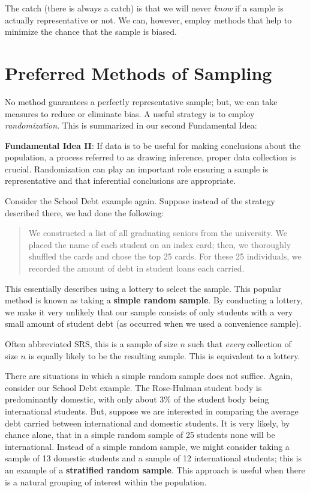 \documentclass[]{book}
\theoremstyle{plain}
\theoremstyle{mydefn}
\theoremstyle{myexmpl}
\theoremstyle{remark}
\let\BeginKnitrBlock\begin \let\EndKnitrBlock\end
\let\BeginKnitrBlock\begin \let\EndKnitrBlock\end
\begin{document}
The catch (there is always a catch) is that we will never \emph{know} if
a sample is actually representative or not. We can, however, employ
methods that help to minimize the chance that the sample is biased.

\section{Preferred Methods of
Sampling}\label{preferred-methods-of-sampling}

No method guarantees a perfectly representative sample; but, we can take
measures to reduce or eliminate bias. A useful strategy is to employ
\emph{randomization}. This is summarized in our second Fundamental Idea:

\BeginKnitrBlock{rmdfivefund}
\textbf{Fundamental Idea II}: If data is to be useful for making
conclusions about the population, a process referred to as drawing
inference, proper data collection is crucial. Randomization can play an
important role ensuring a sample is representative and that inferential
conclusions are appropriate.
\EndKnitrBlock{rmdfivefund}

Consider the School Debt example again. Suppose instead of the strategy
described there, we had done the following:

\begin{quote}
We constructed a list of all graduating seniors from the university. We
placed the name of each student on an index card; then, we thoroughly
shuffled the cards and chose the top 25 cards. For these 25 individuals,
we recorded the amount of debt in student loans each carried.
\end{quote}

This essentially describes using a lottery to select the sample. This
popular method is known as taking a \textbf{simple random sample}. By
conducting a lottery, we make it very unlikely that our sample consists
of only students with a very small amount of student debt (as occurred
when we used a convenience sample).

\BeginKnitrBlock{definition}[Simple Random Sample]
\protect\hypertarget{def:defn-simple-random-sample}{}{\label{def:defn-simple-random-sample}
{} }Often abbreviated SRS, this is a
sample of size \(n\) such that \emph{every} collection of size \(n\) is
equally likely to be the resulting sample. This is equivalent to a
lottery.
\EndKnitrBlock{definition}

There are situations in which a simple random sample does not suffice.
Again, consider our School Debt example. The Rose-Hulman student body is
predominantly domestic, with only about 3\% of the student body being
international students. But, suppose we are interested in comparing the
average debt carried between international and domestic students. It is
very likely, by chance alone, that in a simple random sample of 25
students none will be international. Instead of a simple random sample,
we might consider taking a sample of 13 domestic students and a sample
of 12 international students; this is an example of a \textbf{stratified
random sample}. This approach is useful when there is a natural grouping
of interest within the population.
\end{document}
